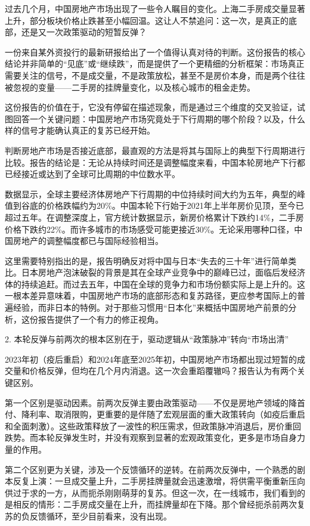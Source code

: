 \documentclass[11pt]{ctexart}
\begin{document}
过去几个月，中国房地产市场出现了一些令人瞩目的变化。上海二手房成交量显著上升，部分板块价格止跌甚至小幅回温。这让人不禁追问：这一次，是真正的底部，还是又一次政策驱动的短暂反弹？

一份来自某外资投行的最新研报给出了一个值得认真对待的判断。这份报告的核心结论并非简单的“见底”或“继续跌”，而是提供了一个更精细的分析框架：市场真正需要关注的信号，不是成交量，不是政策放松，甚至不是房价本身，而是两个往往被忽视的变量——二手房的挂牌量变化，以及核心城市的租金走势。

这份报告的价值在于，它没有停留在描述现象，而是通过三个维度的交叉验证，试图回答一个关键问题：中国房地产市场究竟处于下行周期的哪个阶段？以及，什么样的信号才能确认真正的复苏已经开始。

判断房地产市场是否接近底部，最直观的方法是将其与国际上的典型下行周期进行比较。报告的结论是：无论从持续时间还是调整幅度来看，中国本轮房地产下行都已经接近或达到了全球可比周期的中位数水平。

数据显示，全球主要经济体房地产下行周期的中位持续时间大约为五年，典型的峰值到谷底的价格跌幅约为20\%。中国本轮下行始于2021年上半年房价见顶，至今已超过五年。在调整深度上，官方统计数据显示，新房价格累计下跌约14\%，二手房价格下跌约22\%。而许多城市的市场感受可能更接近30\%。无论采用哪种口径，中国房地产的调整幅度都已与国际经验相当。

这里需要特别指出的是，报告明确反对将中国与日本“失去的三十年”进行简单类比。日本房地产泡沫破裂的背景是其在全球产业竞争中的巅峰已过，面临后发经济体的持续追赶。而过去五年，中国在全球的竞争力和市场份额实际上是上升的。这一根本差异意味着，中国房地产市场的底部形态和复苏路径，更应参考国际上的普遍经验，而非日本的特例。对于那些习惯用“日本化”来概括中国房地产前景的分析，这份报告提供了一个有力的修正视角。

2. 本轮反弹与前两次的根本区别在于，驱动逻辑从“政策脉冲”转向“市场出清”

2023年初（疫后重启）和2024年底至2025年初，中国房地产市场都出现过短暂的成交量和价格反弹，但均在几个月内消退。这一次会重蹈覆辙吗？报告认为有两个关键区别。

第一个区别是驱动因素。前两次反弹主要由政策驱动——不仅是房地产领域的降首付、降利率、取消限购，更重要的是伴随了宏观层面的重大政策转向（如疫后重启和全面刺激）。这些政策释放了一波性的积压需求，但政策脉冲消退后，房价重回跌势。而本轮反弹发生时，并没有观察到显著的宏观政策变化，更多是市场自身力量的作用。

第二个区别更为关键，涉及一个反馈循环的逆转。在前两次反弹中，一个熟悉的剧本反复上演：一旦成交量上升，二手房挂牌量就会迅速激增，将供需平衡重新压向供过于求的一方，从而扼杀刚刚萌芽的复苏。但这一次，在一线城市，我们看到的是相反的情形：二手房成交量在上升，而挂牌量却在下降。那个曾经扼杀前两次复苏的负反馈循环，至少目前看来，没有出现。
\end{document}
